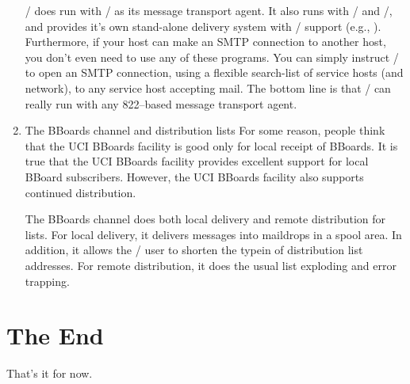 \begin{enumerate}
\MH/ does run with \SendMail/ as its message transport agent.
It also runs with \MMDFI/ and \MMDFII/,
and provides it's own stand-alone delivery system with \UUCP/ support
(e.g., ).
Furthermore,
if your host can make an SMTP connection to another host,
you don't even need to use any of these programs.
You can simply instruct \MH/ to open an SMTP connection,
using a flexible search-list of service hosts (and network),
to any service host accepting mail.
The bottom line is that \MH/ can really run with any 822--based message
transport agent.

\item	The BBoards channel and distribution lists\hbreak
For some reason,
people think that the UCI BBoards facility is good only for local receipt of
BBoards.
It is true that the UCI BBoards facility provides excellent support for local
BBoard subscribers.
However,
the UCI BBoards facility also supports continued distribution.

The BBoards channel does both local delivery and remote distribution for lists.
For local delivery,
it delivers messages into maildrops in a spool area.
In addition,
it allows the \MH/ user to shorten the typein of distribution list addresses.
For remote distribution,
it does the usual list exploding and error trapping.
\end{enumerate}

\section*	{The End}
That's it for now.



\showsummary


